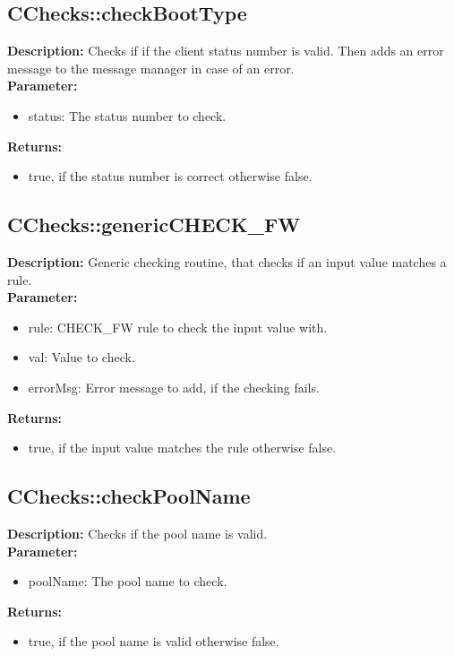 \subsection{CChecks::checkBootType}
\textbf{Description:} Checks if if the client status number is valid. Then adds an error message to the message manager in case of an error.\\
\textbf{Parameter:}
\begin{itemize}
\item status: The status number to check.
\end{itemize}
\textbf{Returns:}
\begin{itemize}
\item true, if the status number is correct otherwise false.
\end{itemize}

\subsection{CChecks::genericCHECK\_FW}
\textbf{Description:} Generic checking routine, that checks if an input value matches a rule.\\
\textbf{Parameter:}
\begin{itemize}
\item rule: CHECK\_FW rule to check the input value with.
\item val: Value to check.
\item errorMsg: Error message to add, if the checking fails.
\end{itemize}
\textbf{Returns:}
\begin{itemize}
\item true, if the input value matches the rule otherwise false.
\end{itemize}

\subsection{CChecks::checkPoolName}
\textbf{Description:} Checks if the pool name is valid.\\
\textbf{Parameter:}
\begin{itemize}
\item poolName: The pool name to check.
\end{itemize}
\textbf{Returns:}
\begin{itemize}
\item true, if the pool name is valid otherwise false.
\end{itemize}


